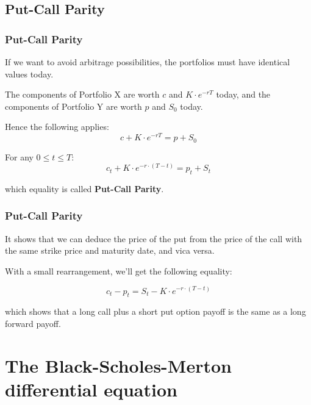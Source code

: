 \documentclass[ignorenonframetext, 9pt]{beamer}
\begin{document}
\subsection{Put-Call Parity}

\begin{frame}
\frametitle{Put-Call Parity}

If we want to avoid arbitrage possibilities, the portfolios must have identical values today. \newline

The components of Portfolio X are worth $c$ and $K\cdot e^{-rT}$ today, and the components of Portfolio Y are worth $p$ and $S_0$ today. \newline

Hence the following applies:
\begin{equation}
c + K\cdot e^{-rT} = p + S_0
\end{equation}

\pause

For any $ 0 \leq t \leq T$:
\begin{equation}
c_t + K\cdot e^{-r\cdot(T-t)} = p_t + S_t
\end{equation}

which equality is called \textbf{Put-Call Parity}. \newline


\end{frame}

\begin{frame}
\frametitle{Put-Call Parity}

It shows that we can deduce the price of the put from the price of the call with the same strike price and maturity date, and vica versa. \newline

\pause

With a small rearrangement, we'll get the following equality:

\begin{equation}
c_t - p_t = S_t - K\cdot e^{-r\cdot(T-t)}
\end{equation}

which shows that a long call plus a short put option payoff is the same as a long forward payoff.
\end{frame}

\section{The Black-Scholes-Merton differential equation}
\end{document}
